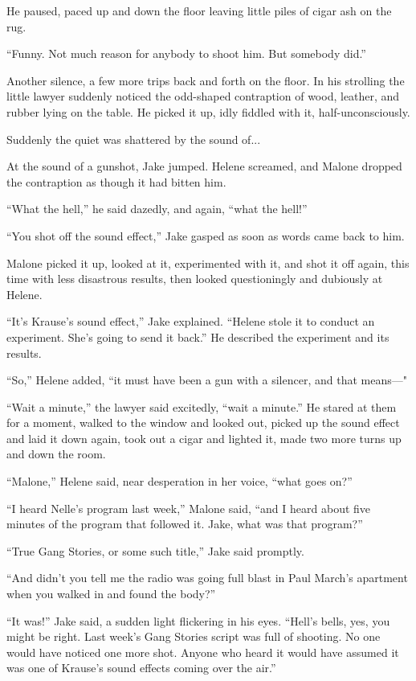 \documentclass{novel}
\begin{document}
He paused, paced up and down the floor leaving little piles of cigar ash on the rug.

“Funny. Not much reason for anybody to shoot him. But somebody did.”

Another silence, a few more trips back and forth on the floor. In his strolling the little lawyer suddenly noticed the odd-shaped contraption of wood, leather, and rubber lying on the table. He picked it up, idly fiddled with it, half-unconsciously.

Suddenly the quiet was shattered by the sound of...

At the sound of a gunshot, Jake jumped. Helene screamed, and Malone dropped the contraption as though it had bitten him.

“What the hell,” he said dazedly, and again, “what the hell!”

“You shot off the sound effect,” Jake gasped as soon as words came back to him.

Malone picked it up, looked at it, experimented with it, and shot it off again, this time with less disastrous results, then looked questioningly and dubiously at Helene.

“It’s Krause’s sound effect,” Jake explained. “Helene stole it to conduct an experiment. She’s going to send it back.” He described the experiment and its results.

“So,” Helene added, “it must have been a gun with a silencer, and that means—"

“Wait a minute,” the lawyer said excitedly, “wait a minute.” He stared at them for a moment, walked to the window and looked out, picked up the sound effect and laid it down again, took out a cigar and lighted it, made two more turns up and down the room.

“Malone,” Helene said, near desperation in her voice, “what goes on?”

“I heard Nelle’s program last week,” Malone said, “and I heard about five minutes of the program that followed it. Jake, what was that program?”

“True Gang Stories, or some such title,” Jake said promptly.

“And didn’t you tell me the radio was going full blast in Paul March’s apartment when you walked in and found the body?”

“It was!” Jake said, a sudden light flickering in his eyes. “Hell’s bells, yes, you might be right. Last week’s Gang Stories script was full of shooting. No one would have noticed one more shot. Anyone who heard it would have assumed it was one of Krause’s sound effects coming over the air.”
\end{document}
